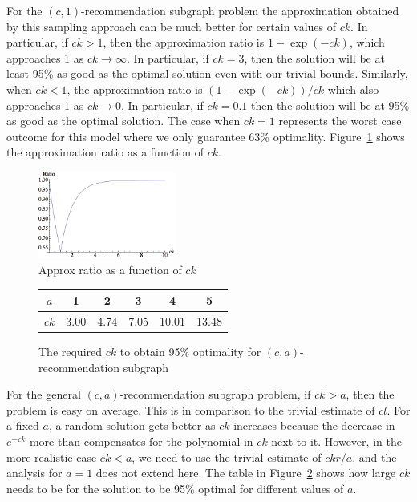 For the $(c, 1)$-recommendation subgraph problem the approximation obtained by this sampling
approach can be much better for certain values of $ck$. In particular,
if $ck>1$, then the approximation ratio is $1-\exp(-ck)$, which
approaches 1 as $ck\to\infty$. In particular, if $ck=3$, then the
solution will be at least 95\% as good as the optimal solution even
with our trivial bounds. Similarly, when $ck<1$, the approximation
ratio is $(1-\exp(-ck))/ck$ which also approaches 1 as $ck\to 0$. In
particular, if $ck=0.1$ then the solution will be at 95\% as good as
the optimal solution. The case when $ck=1$ represents the
worst case outcome for this model where we only guarantee 63\%
optimality. Figure~\ref{fig:simple_approx} shows the approximation ratio as a
function of $ck$.\vs

\begin{figure}[H]
  \centering
  \includegraphics[width=0.4\textwidth]{images/sri_Original.png}
  \caption{Approx ratio as a function of $ck$ }\label{fig:simple_approx}
\end{figure}

\begin{figure}[H]
  \centering
  \begin{tabular}{ |c|c|c|c|c|c| }
    \hline
    $a$ & 1 & 2 & 3 & 4 & 5 \\ \hline
    $ck$ & 3.00 & 4.74 & 7.05 & 10.01 & 13.48 \\
    \hline
  \end{tabular}
  \caption{The required $ck$ to obtain 95\% optimality for $(c, a)$-recommendation subgraph}
  \label{a-values}
\end{figure}




For the general $(c, a)$-recommendation subgraph problem, if $ck>a$, then the problem is easy on average. This
is in comparison to the trivial estimate of $cl$. For a fixed $a$, a
random solution gets better as $ck$ increases because the decrease in
$e^{-ck}$ more than compensates for the polynomial in $ck$ next to
it. However, in the more realistic case $ck<a$, we need to use the
trivial estimate of $ckr/a$, and the analysis for $a=1$ does not extend here.
The table in Figure~\ref{a-values} shows how large
$ck$ needs to be for the solution to be 95\% optimal for different
values of $a$.\vs

